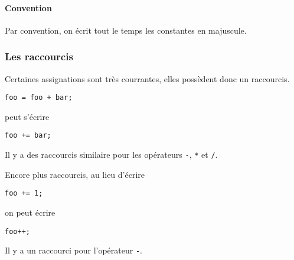 \paragraph{Convention}
Par convention, on écrit tout le temps les constantes en majuscule.

\subsubsection{Les raccourcis}
Certaines assignations sont très courrantes, elles possèdent donc un raccourcis.
\begin{lstlisting}
foo = foo + bar;
\end{lstlisting}
peut s'écrire
\begin{lstlisting}
foo += bar;
\end{lstlisting}
Il y a des raccourcis similaire pour les opérateurs
\lstinline|-|, \lstinline|*| et \lstinline|/|.

Encore plus raccourcis, au lieu d'écrire
\begin{lstlisting}
foo += 1;
\end{lstlisting}
on peut écrire
\begin{lstlisting}
foo++;
\end{lstlisting}
Il y a un raccourci pour l'opérateur \lstinline|-|.


